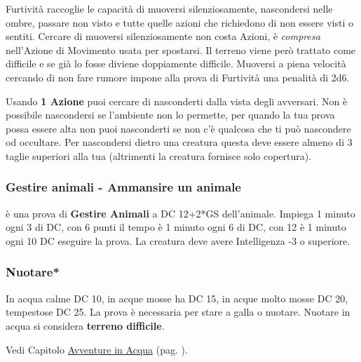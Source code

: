 \begin{multicols}{2}
Furtività raccoglie le capacità di muoversi silenziosamente, nascondersi nelle ombre, passare non visto e tutte quelle azioni che richiedono di non essere visti o sentiti.
Cercare di muoversi silenziosamente non costa Azioni, è \emph{compresa} nell'Azione di Movimento usata per spostarsi. Il terreno viene però trattato come difficile e se già lo fosse diviene doppiamente difficile. Muoversi a piena velocità cercando di non fare rumore impone alla prova di Furtività una penalità di 2d6.

Usando \textbf{1 Azione} puoi cercare di nasconderti dalla vista degli avversari. Non è possibile nascondersi se l'ambiente non lo permette, per quando la tua prova possa essere alta non puoi nasconderti se non c'è qualcosa che ti può nascondere od occultare. Per nascondersi dietro una creatura questa deve essere almeno di 3 taglie superiori alla tua (altrimenti la creatura fornisce solo copertura).

\titlespacing*{\subsubsection}{0pt}{0.5em}{0.5em}\subsubsection*{Gestire animali - Ammansire un animale}\label{gestireanimali}
è una prova di \textbf{Gestire Animali} a DC 12+2*GS dell'animale. Impiega 1 minuto ogni 3 di DC, con 6 punti il tempo è 1 minuto ogni 6 di DC, con 12 è 1 minuto ogni 10 DC eseguire la prova. La creatura deve avere Intelligenza -3 o superiore.

\titlespacing*{\subsubsection}{0pt}{0.5em}{0.5em}\subsubsection*{Nuotare*}\label{compnuotare}

In acqua calme DC 10, in acque mosse ha DC 15, in acque molto mosse DC 20, tempestose DC 25. La prova è necessaria per stare a galla o nuotare. Nuotare in acqua si considera \textbf{terreno difficile}.

Vedi Capitolo \hyperlink{combatteresottacqua}{Avventure in Acqua} (pag. \pageref{combatteresottacqua}).


\end{multicols}

